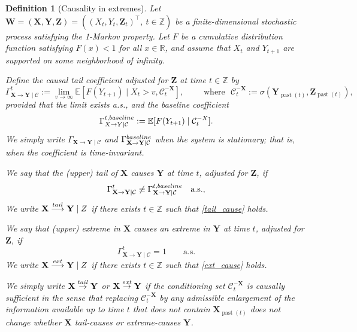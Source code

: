 \documentclass[a4paper,11pt]{article}
\newtheorem{definition}{Definition}
\newcommand{\toverset}[2]{\overset{{\rm #1}}{#2}}
\newcommand{\baseline}{{\rm baseline}}
\DeclareMathOperator{\past}{past}
\begin{document}
\begin{definition}[Causality in extremes]\label{definiton_of_tail_causality}
Let \(\mathbf W=(\mathbf X,\mathbf Y,\mathbf Z)=((X_t,Y_t,\mathbf Z_t)^\top,\ t\in\mathbb Z)\) be a finite-dimensional stochastic process satisfying the 1-Markov property. Let \(F\) be a cumulative distribution function satisfying \(F(x)<1\) for all \(x\in\mathbb R\), and assume that \(X_t\) and \(Y_{t+1}\) are supported on some neighborhood of infinity.

Define the causal tail coefficient adjusted for \(\textbf{Z}\) at time $t\in\mathbb Z$ by
\begin{equation}\label{CTC_definition}
\Gamma_{\textbf{X}\to\textbf{Y}\mid\mathcal{C}}^t:=  \lim_{v\to\infty} \mathbb{E}[ F(Y_{t+1})\mid X_t>v,\mathcal{C}^{-\textbf{X}}_t], \qquad  \text{ where }  \,\, \mathcal{C}_t^{-\mathbf X}:=\sigma(\mathbf Y_{\past(t)},\mathbf Z_{\past(t)}),
\end{equation}
provided that the limit exists a.s., and the baseline coefficient
\[
\Gamma_{\textbf{X}\to\textbf{Y}\mid\mathcal{C}}^{t, \baseline}:=\mathbb{E}[ F(Y_{t+1})\mid  \mathcal{C}^{-\textbf{X}}_t]. 
\]
We simply write  $\Gamma_{\mathbf X\to\mathbf Y\mid\mathcal{C}}$ and $   \Gamma_{\mathbf X\to\mathbf Y\mid\mathcal{C}}^{\baseline}$ when the system is stationary; that is, when the coefficient is time-invariant.

We say that the (upper) tail of \(\mathbf X\) causes \(\mathbf Y\) at time \(t\), adjusted for \(\textbf{Z}\), if
\begin{equation}
\label{tail_cause}
\Gamma_{\mathbf X\to\mathbf Y\mid \mathcal C}^t
\not\equiv
\Gamma_{\mathbf X\to\mathbf Y\mid \mathcal C}^{t,\baseline}
\quad \text{a.s.},
\end{equation}
We write $\mathbf X \toverset{tail}{\longrightarrow} \mathbf Y\mid \textbf{Z}$ if there exists \(t\in\mathbb Z\) such that \eqref{tail_cause} holds. 

We say that (upper) extreme in \(\mathbf X\) causes an extreme in \(\mathbf Y\) at time \(t\), adjusted for \(\textbf{Z}\), if
\begin{equation}
    \label{ext_cause}
        \Gamma_{\mathbf X\to\mathbf Y\mid \mathcal{C}}^t=1
    \qquad \text{a.s.}
\end{equation}
We write $   \mathbf X \toverset{ext}{\longrightarrow} \mathbf Y\mid \textbf{Z}$ if there exists \(t\in\mathbb Z\) such that  \eqref{ext_cause} holds. 

We simply write \(\mathbf X\toverset{tail}{\to}\mathbf Y\) or \(\mathbf X\toverset{ext}{\to}\mathbf Y\) if the conditioning set \(\mathcal C_t^{-\mathbf X}\) is causally sufficient in the sense that replacing \(\mathcal C_t^{-\mathbf X}\) by any admissible enlargement of the information available up to time \(t\) that does not contain \(\mathbf X_{\past(t)}\) does not change whether \(\mathbf X\) tail-causes or  extreme-causes \(\mathbf Y\). 
\end{definition}
\end{document}

